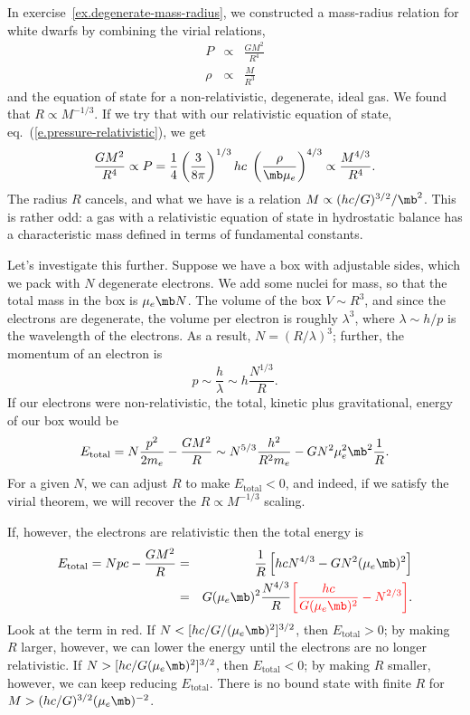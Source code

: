 In exercise~\ref{ex.degenerate-mass-radius}, we constructed a mass-radius relation for white dwarfs by combining the virial relations,
\begin{eqnarray*}
   P    &\propto& \frac{GM^{2}}{R^{4}}\\
   \rho &\propto& \frac{M}{R^{3}}
\end{eqnarray*}
and the equation of state for a non-relativistic, degenerate, ideal gas.  We found that $R\propto M^{-1/3}$.  If we try that with our relativistic equation of state, eq.~(\ref{e.pressure-relativistic}), we get
\[
	\frac{GM^{2}}{R^{4}} \propto P = \frac{1}{4}\left(\frac{3}{8\pi}\right)^{1/3}hc\; \left(\frac{\rho}{\mb\mu_{e}}\right)^{4/3} \propto \frac{M^{4/3}}{R^{4}}.
\]
The radius $R$ cancels, and what we have is a relation $M\propto (hc/G)^{3/2}/\mb^{2}$.  This is rather odd: a gas with a relativistic equation of state in hydrostatic balance has a characteristic mass defined in terms of fundamental constants.

Let's investigate this further. Suppose we have a box with adjustable sides, which we pack with $N$ degenerate electrons. We add some nuclei for mass, so that the total mass in the box is $\mu_{e}\mb N$. The volume of the box $V \sim R^{3}$, and since the electrons are degenerate, the volume per electron is roughly $\lambda^{3}$, where $\lambda \sim h/p$ is the wavelength of the electrons.  As a result, $N = (R/\lambda)^{3}$; further, the momentum of an electron is
\[	p \sim \frac{h}{\lambda} \sim h\frac{N^{1/3}}{R}. \]
If our electrons were non-relativistic, the total, kinetic plus gravitational, energy of our box would be
\[
	E_{\mathrm{total}} = N\frac{p^{2}}{2m_{e}} - \frac{GM^{2}}{R} \sim N^{5/3}\frac{h^{2}}{R^{2}m_{e}} - GN^{2}\mu_{e}^{2}\mb^{2} \frac{1}{R}.
\]
For a given $N$, we can adjust $R$ to make $E_{\mathrm{total}}<0$, and indeed, if we satisfy the virial theorem, we will recover the $R\propto M^{-1/3}$ scaling.

If, however, the electrons are relativistic then the total energy is
\begin{eqnarray*}
	E_{\mathrm{total}} = Npc - \frac{GM^{2}}{R} 
		&=& \frac{1}{R}\left[hc N^{4/3} - G N^{2}(\mu_{e}\mb)^{2}\right]\\
		&=& G(\mu_{e}\mb)^{2}\frac{N^{4/3}}{R}
		{\color{red}\left[ \frac{hc}{G(\mu_{e}\mb)^{2}} - N^{2/3}\right]}.
\end{eqnarray*}
Look at the term in red.
If $N < [hc/G/(\mu_{e}\mb)^{2}]^{3/2}$, then $E_{\mathrm{total}} > 0$; by making $R$ larger, however, we can lower the energy until the electrons are no longer relativistic.  If $N > [hc/G(\mu_{e}\mb)^{2}]^{3/2}$, then $E_{\mathrm{total}} < 0$; by making $R$ smaller, however, we can keep reducing $E_{\mathrm{total}}$. There is no bound state with finite $R$ for $M>(hc/G)^{3/2}(\mu_{e}\mb)^{-2}$.

